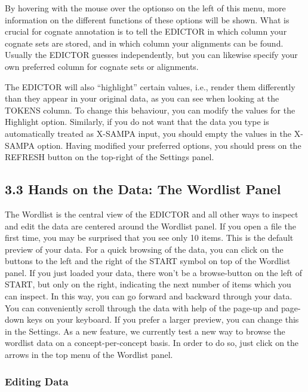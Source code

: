 \documentclass[a4paper,svgnames]{scrartcl}
\begin{document}
By hovering with the mouse over the optionso on the left of this menu,
more information on the different functions of these options will be
shown. What is crucial for cognate annotation is to tell the EDICTOR in
which column your cognate sets are stored, and in which column your
alignments can be found. Usually the EDICTOR guesses independently, but
you can likewise specify your own preferred column for cognate sets or
alignments.

The EDICTOR will also ``highlight'' certain values, i.e., render them
differently than they appear in your original data, as you can see when
looking at the TOKENS column. To change this behaviour, you can modify
the values for the Highlight option. Similarly, if you do not want that
the data you type is automatically treated as X-SAMPA input, you should
empty the values in the X-SAMPA option. Having modified your preferred
options, you should press on the REFRESH button on the top-right of the
Settings panel.

\subsection*{3.3 Hands on the Data: The Wordlist
Panel}\label{hands-on-the-data-the-wordlist-panel}

The Wordlist is the central view of the EDICTOR and all other ways to
inspect and edit the data are centered around the Wordlist panel. If you
open a file the first time, you may be surprised that you see only 10
items. This is the default preview of your data. For a quick browsing of
the data, you can click on the buttons to the left and the right of the
START symbol on top of the Wordlist panel. If you just loaded your data,
there won't be a browse-button on the left of START, but only on the
right, indicating the next number of items which you can inspect. In
this way, you can go forward and backward through your data. You can
conveniently scroll through the data with help of the page-up and
page-down keys on your keyboard. If you prefer a larger preview, you can
change this in the Settings. As a new feature, we currently test a new
way to browse the wordlist data on a concept-per-concept basis. In order
to do so, just click on the arrows in the top menu of the Wordlist
panel.

\subsubsection*{Editing Data}\label{editing-data}
\end{document}
